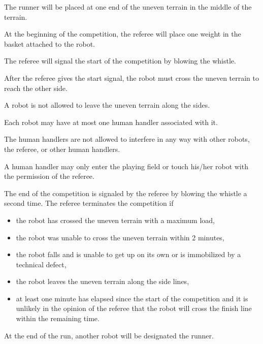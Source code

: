 \documentclass[12pt]{hurocup}
\begin{document}
\begin{lawlist}[LC]
\item The runner will be placed at one end of the uneven terrain in
the middle of the terrain.

\item At the beginning of the competition, the referee will place one
  weight in the basket attached to the robot.

\item The referee will signal the start of the competition by blowing
  the whistle.

\item After the referee gives the start signal, the robot must cross
  the uneven terrain to reach the other side.

\item A robot is not allowed to leave the uneven terrain along the sides.

\item Each robot may have at most one human handler associated with
  it.

\item \label{lc-handler5} The human handlers are not allowed to
  interfere in any way with other robots, the referee, or other human
  handlers.

\item \label{lc-handler6} A human handler may only enter the playing
  field or touch his/her robot with the permission of the referee.

\item The end of the competition is signaled by the referee by
  blowing the whistle a second time.
  The referee terminates the competition if
  \begin{itemize}
  \item the robot has crossed the uneven terrain with a maximum load,
  \item the robot was unable to cross the uneven terrain within 2 minutes,
  \item the robot falls and is unable to get up on its own or is
    immobilized by a technical defect, 
  \item the robot leaves the uneven terrain along the side lines,
  \item at least one minute has elapsed since the start of the
    competition and it is unlikely in the opinion of the referee that
    the robot will cross the finish line within the remaining time.
  \end{itemize}

\item At the end of the run, another robot will be designated the
  runner.

\end{lawlist}
\end{document}

